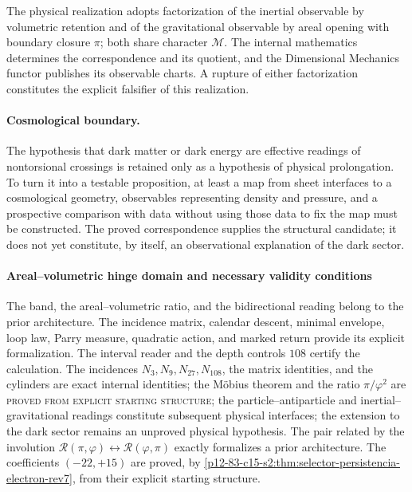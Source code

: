 The physical realization adopts factorization of the inertial observable by
volumetric retention and of the gravitational observable by areal opening
with boundary closure \(\pi\); both share character \(\mathcal M\). The
internal mathematics determines the correspondence and its quotient, and the
Dimensional Mechanics functor publishes its observable charts. A rupture of either
factorization constitutes the explicit falsifier of this realization.

\paragraph{Cosmological boundary.}
The hypothesis that dark matter or dark energy are effective readings of nontorsional crossings is retained only as a hypothesis of physical prolongation. To turn it into a testable proposition, at least a map from sheet interfaces to a cosmological geometry, observables representing density and pressure, and a prospective comparison with data without using those data to fix the map must be constructed. The proved correspondence supplies the structural candidate; it does not yet constitute, by itself, an observational explanation of the dark sector.

\paragraph{Areal–volumetric hinge domain and necessary validity conditions}
The band, the areal--volumetric ratio, and the bidirectional reading belong to
the prior architecture. The incidence matrix, calendar descent,
minimal envelope, loop law, Parry measure, quadratic action,
and marked return provide its explicit formalization. The
interval reader and the depth controls \(108\) certify the
calculation. The incidences \(N_3,N_9,N_{27},N_{108}\), the matrix
identities, and the cylinders are exact internal identities; the Möbius theorem and the ratio
\(\pi/\varphi^2\) are
\textsc{proved from explicit starting structure}; the
particle--antiparticle and inertial--gravitational readings constitute subsequent physical
interfaces; the extension to the dark sector remains an
unproved physical hypothesis. The pair related by the involution
\(\mathscr R(\pi,\varphi)\leftrightarrow
\mathscr R(\varphi,\pi)\) exactly formalizes a prior architecture. The
coefficients \((-22,+15)\) are proved, by
\cref{p12-83-c15-s2:thm:selector-persistencia-electron-rev7}, from their explicit starting
structure.

